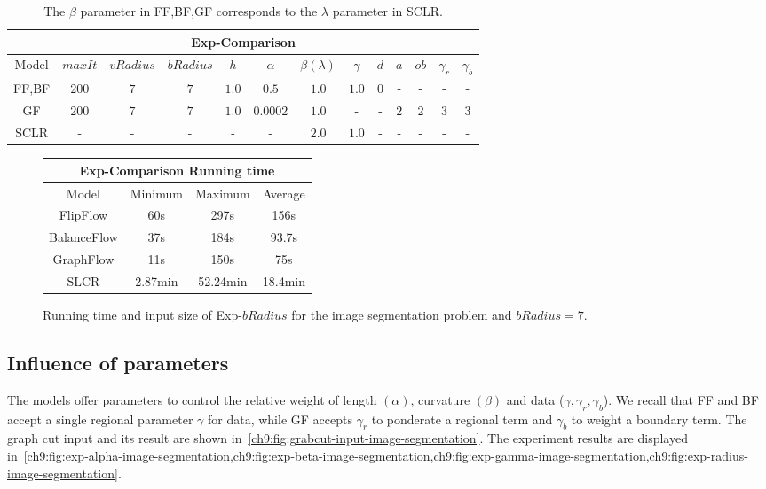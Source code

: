 \begin{table}
\small
\centering
\begin{tabular}{|c|c|c|c|c|c|c|c|c|c|c|c|c|}
\hline
\multicolumn{13}{|c|}{Exp-Comparison}\\
\hline
Model & $maxIt$ & $vRadius$ & $bRadius$ & $h$ & $\alpha$ & $\beta (\lambda)$  & $\gamma$ & $d$ & $a$ & $ob$ & $\gamma_r$ & $\gamma_b$ \\
\hline
FF,BF & $200$ & $7$ & $7$ & $1.0$ & $0.5$ & $1.0$ & $1.0$ & $0$ & - & - & - & -\\
\hline
GF & $200$ & $7$ & $7$ & $1.0$ & $0.0002$ & $1.0$ & - & - & $2$ & $2$ & $3$ & $3$\\
\hline
SCLR & - & - & - & - & - & $2.0$ & $1.0$ & - & - & - & - & -\\
\hline
\end{tabular}
\caption{ The $\beta$ parameter in FF,BF,GF corresponds to the $\lambda$ parameter in SCLR.}
\label{ch9:tab:image-segmentation-comparison-summary}
\end{table}

\begin{figure}
\center
\captionsetup{type=table}
\begin{tabular}{|c|c|c|c|}
\hline
\multicolumn{4}{|c|}{Exp-Comparison Running time}\\
\hline
Model & Minimum & Maximum & Average \\
\hline
FlipFlow & 60s & 297s & 156s\\
BalanceFlow & 37s & 184s & 93.7s\\
GraphFlow & 11s & 150s & 75s\\
SLCR & 2.87min & 52.24min & 18.4min\\
\hline
\end{tabular}
\caption{Running time and input size of Exp-$bRadius$ for the image segmentation problem and $bRadius=7$.}
\label{ch9:tab:rtime-image-segmentation-general} 
\end{figure}

\subsection{Influence of parameters}
The models offer parameters to control the relative weight of length $(\alpha)$, curvature $(\beta)$ and data ($\gamma,\gamma _r, \gamma _b$). We recall that FF and BF accept a single regional parameter $\gamma$ for data, while GF accepts $\gamma _r$ to ponderate a regional term and $\gamma _b$ to weight a boundary term. The graph cut input and its result are shown in~\cref{ch9:fig:grabcut-input-image-segmentation}. The experiment results are displayed in~\cref{ch9:fig:exp-alpha-image-segmentation,ch9:fig:exp-beta-image-segmentation,ch9:fig:exp-gamma-image-segmentation,ch9:fig:exp-radius-image-segmentation}. 

